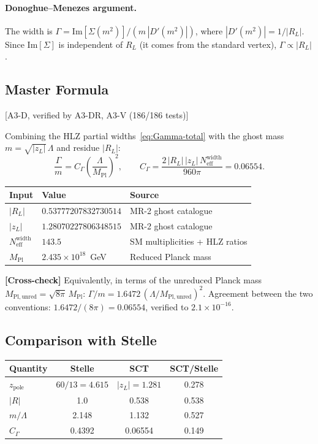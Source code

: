 \documentclass[11pt,a4paper]{article}
\theoremstyle{plain}
\theoremstyle{definition}
\theoremstyle{remark}
\newcommand{\MPl}{M_{\mathrm{Pl}}}
\newcommand{\Neff}{N_{\mathrm{eff}}}
\newcommand{\fromlit}[1]{\textcolor{blue!70!black}{\textsf{[#1]}}}
\newcommand{\crosscheck}[1]{%
  \par\smallskip\noindent
  \colorbox{blue!10}{\parbox{\dimexpr\linewidth-2\fboxsep}{%
    \textcolor{blue!50!black}{\textbf{[Cross-check]}} #1}}%
  \par\smallskip}
\begin{document}
\paragraph{Donoghue--Menezes argument.} The width is
$\Gamma = \mathrm{Im}[\Sigma(m^2)]/(m\,|D'(m^2)|)$, where
$|D'(m^2)| = 1/|R_L|$.  Since $\mathrm{Im}[\Sigma]$ is independent of
$R_L$ (it comes from the standard vertex), $\Gamma \propto |R_L|$.

\subsection{Master Formula}

\fromlit{A3-D, verified by A3-DR, A3-V (186/186 tests)}

Combining the HLZ partial widths~\eqref{eq:Gamma-total} with the ghost
mass $m = \sqrt{|z_L|}\,\Lambda$ and residue $|R_L|$:
\begin{equation}\label{eq:master-width}
  \boxed{
  \frac{\Gamma}{m}
  = C_\Gamma\!\left(\frac{\Lambda}{\MPl}\right)^{\!2},
  \qquad
  C_\Gamma
  = \frac{2\,|R_L|\,|z_L|\,\Neff^{\mathrm{width}}}{960\pi}
  = 0.06554.}
\end{equation}

\begin{center}
\begin{tabular}{lll}
\toprule
Input & Value & Source \\
\midrule
$|R_L|$ & $0.53777207832730514$ & MR-2 ghost catalogue \\
$|z_L|$ & $1.28070227806348515$ & MR-2 ghost catalogue \\
$\Neff^{\mathrm{width}}$ & $143.5$ & SM multiplicities + HLZ ratios \\
$\MPl$ & $2.435 \times 10^{18}$~GeV & Reduced Planck mass \\
\bottomrule
\end{tabular}
\end{center}

\crosscheck{Equivalently, in terms of the unreduced Planck mass
$M_{\mathrm{Pl,unred}} = \sqrt{8\pi}\,\MPl$:
$\Gamma/m = 1.6472\,({\Lambda}/{M_{\mathrm{Pl,unred}}})^2$.
Agreement between the two conventions: $1.6472/(8\pi) = 0.06554$,
verified to $2.1 \times 10^{-16}$.}

\subsection{Comparison with Stelle}

\begin{center}
\begin{tabular}{lccc}
\toprule
Quantity & Stelle & SCT & SCT/Stelle \\
\midrule
$z_{\mathrm{pole}}$ & $60/13 = 4.615$ & $|z_L| = 1.281$ & 0.278 \\
$|R|$ & 1.0 & 0.538 & 0.538 \\
$m/\Lambda$ & 2.148 & 1.132 & 0.527 \\
$C_\Gamma$ & 0.4392 & 0.06554 & 0.149 \\
\bottomrule
\end{tabular}
\end{center}
\end{document}
